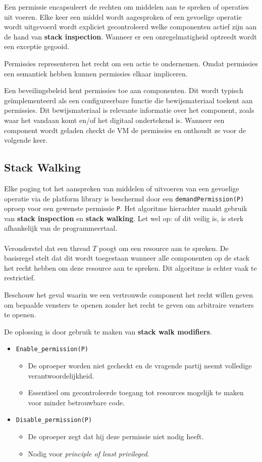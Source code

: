 \documentclass[../main.tex]{subfiles}
\begin{document}
Een permissie encapsuleert de rechten om middelen aan te spreken of operaties uit voeren. Elke keer een middel wordt aagesproken of een gevoelige operatie wordt uitgevoerd wordt expliciet gecontroleerd welke componenten actief zijn aan de hand van \textbf{stack inspection}. Wanneer er een onregelmatigheid optreedt wordt een exceptie gegooid.

Permissies representeren het recht om een actie te ondernemen. Omdat permissies een semantiek hebben kunnen permissies elkaar impliceren. 

Een beveilingsbeleid kent permissies toe aan componenten. Dit wordt typisch ge\"implementeerd als een configureerbare functie die bewijsmateriaal toekent aan permissies. Dit bewijsmateriaal is relevante informatie over het component, zoals waar het vandaan komt en/of het digitaal ondertekend is. Wanneer een component wordt geladen checkt de VM de permissies en onthoudt ze voor de volgende keer. 



\subsection{Stack Walking}
Elke poging tot het aanspreken van middelen of uitvoeren van een gevoelige operatie via de platform library is beschermd door een \texttt{demandPermission(P)} oproep voor een gewenste permissie \texttt{P}. Het algoritme hierachter maakt gebruik van \textbf{stack inspection} en \textbf{stack walking}. Let wel op: of dit veilig is, is sterk afhankelijk van de programmeertaal.
\\\\
Veronderstel dat een thread $T$ poogt om een resource aan te spreken. De basisregel stelt dat dit wordt toegestaan wanneer alle componenten op de stack het recht hebben om deze resource aan te spreken. Dit algoritme is echter vaak te restrictief.

\begin{blockquote}
Beschouw het geval waarin we een vertrouwde component het recht willen geven om bepaalde vensters te openen zonder het recht te geven om arbitraire vensters te openen.
\end{blockquote}
\noindent
De oplossing is door gebruik te maken van \textbf{stack walk modifiers}.
\begin{itemize}
	\item \texttt{Enable\_permission(P)}
	\begin{itemize}
		\item De oproeper worden niet gecheckt en de vragende partij neemt volledige verantwoordelijkheid.
		\item Essentieel om gecontroleerde toegang tot resources mogelijk te maken voor minder betrouwbare code.
	\end{itemize}
	\item \texttt{Disable\_permission(P)}
	\begin{itemize}
		\item De oproeper zegt dat hij deze permissie niet nodig heeft.
		\item Nodig voor \textit{principle of least privileged}.
	\end{itemize}
\end{itemize}
\end{document}
